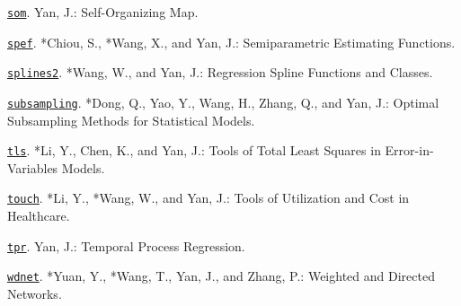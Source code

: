\begin{Software}
\item \href{https://CRAN.R-project.org/package=som}{\texttt{som}}. Yan, J.:
Self-Organizing Map.

\item \href{https://CRAN.R-project.org/package=spef}{\texttt{spef}}.
*Chiou, S., *Wang, X., and Yan, J.:
Semiparametric Estimating Functions.

\item \href{https://CRAN.R-project.org/package=splines2}{\texttt{splines2}}.
*Wang, W., and Yan, J.: Regression Spline Functions and
Classes.

\item \href{https://CRAN.R-project.org/package=subsampling}{\texttt{subsampling}}.
*Dong, Q., Yao, Y., Wang, H., Zhang, Q., and Yan, J.:
Optimal Subsampling Methods for Statistical Models.

\item \href{https://CRAN.R-project.org/package=tls}{\texttt{tls}}.
*Li, Y., Chen, K., and Yan, J.: Tools of Total Least Squares
in Error-in-Variables Models.

\item \href{https://CRAN.R-project.org/package=touch}{\texttt{touch}}.
*Li, Y., *Wang, W., and Yan, J.: Tools of
Utilization and Cost in Healthcare.

\item \href{https://CRAN.R-project.org/package=tpr}{\texttt{tpr}}. Yan, J.:
Temporal Process Regression.

\item \href{https://CRAN.R-project.org/package=wdnet}{\texttt{wdnet}}.
*Yuan, Y., *Wang, T., Yan, J., and Zhang, P.:
Weighted and Directed Networks.

\end{Software}

